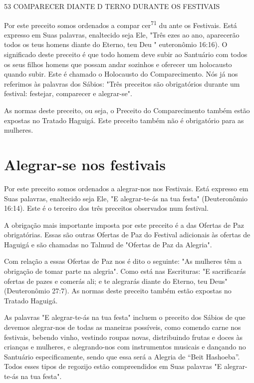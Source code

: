 53 COMPARECER DIANTE D TERNO DURANTE OS FESTIVAIS

Por este preceito somos ordenados a compar cer\textsuperscript{71} du
ante os Fes­tivais. Está expresso em Suas palavras, enaltecido seja Ele,
"Três ezes ao ano, aparecerão todos os teus homens diante do Eterno, teu
Deu " euteronômio 16:16). O significado deste preceito é que todo homem
deve subir ao Santuá­rio com todos os seus filhos homens que possam
andar sozinhos e oferecer um holocausto quando subir. Este é chamado o
Holocausto do Comparecimento. Nós já nos referimos às palavras dos
Sábios: "Três preceitos são obrigatórios durante um festival: festejar,
comparecer e alegrar-se".

As normas deste preceito, ou seja, o Preceito do Comparecimento também
estão expostas no Tratado Haguigá. Este preceito também não é
obri­gatório para as mulheres.

\section{Alegrar-se nos festivais}

Por este preceito somos ordenados a alegrar-nos nos Festivais. Está
expresso em Suas palavras, enaltecido seja Ele, "E alegrar-te-ás na tua
festa" (Deuteronômio 16:14). Este é o terceiro dos três preceitos
observados num festival.

A obrigação mais importante imposta por este preceito é a das Ofer­tas
de Paz obrigatórias. Essas são outras Ofertas de Paz do Festival
adicionais às ofertas de Haguigá e são chamadas no Talmud de "Ofertas de
Paz da Alegria".

Com relação a essas Ofertas de Paz nos é dito o seguinte: "As mulhe­res
têm a obrigação de tomar parte na alegria". Como está nas Escrituras: "E
sacrificarás ofertas de pazes e comerás ali; e te alegrarás diante do
Eterno, teu Deus" (Deuteronômio 27:7). As normas deste preceito também
estão expostas no Tratado Haguigá.

As palavras "E alegrar-te-ás na tua festa" incluem o preceito dos
Sá­bios de que devemos alegrar-nos de todas as maneiras possíveis, como
comen­do carne nos festivais, bebendo vinho, vestindo roupas novas,
distribuindo frutas e doces às crianças e mulheres, e alegrando-nos com
instrumentos musicais e dançando no Santuário especificamente, sendo que
essa será a Alegria de ``Beit Hashoeba''. Todos esses tipos de regozijo
estão compreendidos em Suas pala­vras "E alegrar-te-ás na tua festa".

